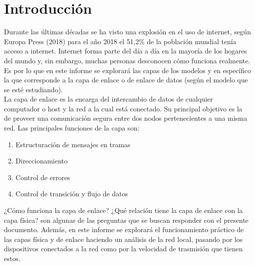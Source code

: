 \section{Introducción}

Durante las últimas décadas se ha visto una explosión en el uso de internet, según Europa Press (2018) \cite{ElTiempo} para el año 2018 el 51,2\% de la población mundial tenía acceso a internet. Internet forma parte del día a día en la mayoría de los hogares del mundo y, sin embargo, muchas personas desconocen cómo funciona realmente. Es por lo que en este informe se explorará las capas de los modelos y en específico la que corresponde a la capa de enlace o de enlace de datos (según el modelo que se esté estudiando).  \\

\noindent La capa de enlace es la encarga del intercambio de datos de cualquier computador o host y la red a la cual está conectado. Su principal objetivo es la de proveer una comunicación segura entre dos nodos pertenecientes a una misma red. Las principales funciones de la capa son: 

\begin{enumerate}
    \item Estructuración de mensajes en tramas
    \item Direccionamiento
    \item Control de errores
    \item Control de transición y flujo de datos
\end{enumerate}


\noindent ¿Cómo funciona la capa de enlace? ¿Qué relación tiene la capa de enlace con la capa física?  son algunas de las preguntas que se buscan responder con el presente documento. Además, en este informe se explorará el funcionamiento práctico de las capas física y de enlace haciendo un análisis de la red local, pasando por los dispositivos conectados a la red como por la velocidad de trasmisión que tienen estos.
